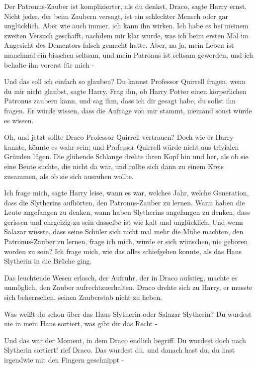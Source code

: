 \glqq{}Der Patronus-Zauber ist komplizierter, als du denkst, Draco\grqq{}, sagte
Harry ernst. \glqq{}Nicht jeder, der beim Zaubern versagt, ist ein schlechter
Mensch oder gar unglücklich. Aber wie auch immer, ich kann ihn wirken. Ich habe
es bei meinem zweiten Versuch geschafft, nachdem mir klar wurde, was ich beim
ersten Mal im Angesicht des Dementors falsch gemacht hatte. Aber, na ja, mein
Leben ist manchmal ein bisschen seltsam, und mein Patronus ist seltsam geworden,
und ich behalte ihn vorerst für mich -\grqq{}

\glqq{}Und das soll ich einfach so glauben?\grqq{} \glqq{}Du kannst Professor
Quirrell fragen, wenn du mir nicht glaubst\grqq{}, sagte Harry. \glqq{}Frag ihn,
ob Harry Potter einen körperlichen Patronus zaubern kann, und sag ihm, dass ich
dir gesagt habe, du sollst ihn fragen. Er würde wissen, dass die Anfrage von mir
stammt, niemand sonst würde es wissen.\grqq{}

Oh, und jetzt sollte Draco Professor Quirrell vertrauen? Doch wie er Harry
kannte, könnte es wahr sein; und Professor Quirrell würde nicht aus trivialen
Gründen lügen. Die glühende Schlange drehte ihren Kopf hin und her, als ob sie
eine Beute suchte, die nicht da war, und rollte sich dann zu einem Kreis
zusammen, als ob sie sich ausruhen wollte.

\glqq{}Ich frage mich\grqq{}, sagte Harry leise, \glqq{}wann es war, welches Jahr,
welche Generation, dass die Slytherins aufhörten, den Patronus-Zauber zu lernen.
Wann haben die Leute angefangen zu denken, wann haben Slytherins angefangen zu
denken, dass gerissen und ehrgeizig zu sein dasselbe ist wie kalt und
unglücklich. Und wenn Salazar wüsste, dass seine Schüler sich nicht mal mehr die
Mühe machten, den Patronus-Zauber zu lernen, frage ich mich, würde er sich
wünschen, nie geboren worden zu sein? Ich frage mich, wie das alles schiefgehen
konnte, als das Haus Slytherin in die Brüche ging.\grqq{}

Das leuchtende Wesen erlosch, der Aufruhr, der in Draco aufstieg, machte es
unmöglich, den Zauber aufrechtzuerhalten. Draco drehte sich zu Harry, er musste
sich beherrschen, seinen Zauberstab nicht zu heben.

\glqq{}Was weißt du schon über das Haus Slytherin oder Salazar Slytherin? Du
wurdest nie in mein Haus sortiert, was gibt dir das Recht -\grqq{}

Und das war der Moment, in dem Draco endlich begriff. \glqq{}Du wurdest doch nach
Slytherin sortiert!\grqq{} rief Draco. \glqq{}Das wurdest du, und danach hast du,
du hast irgendwie mit den Fingern geschnippt -\grqq{}

